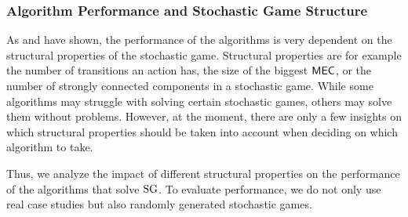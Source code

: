 \subsubsection*{Algorithm Performance and Stochastic Game Structure}
As \cite{haddadmonmege} and \cite{gandalf} have shown, the performance of the algorithms is very dependent on the structural properties of the stochastic game.
Structural properties are for example the number of transitions an action has, the size of the biggest $\mathsf{MEC}$, or the number of strongly connected components in a stochastic game.
While some algorithms may struggle with solving certain stochastic games, others may solve them without problems.
However, at the moment, there are only a few insights on which structural properties should be taken into account when deciding on which algorithm to take.

Thus, we analyze the impact of different structural properties on the performance of the algorithms that solve $\textrm{SG}$.
To evaluate performance, we do not only use real case studies but also randomly generated stochastic games.